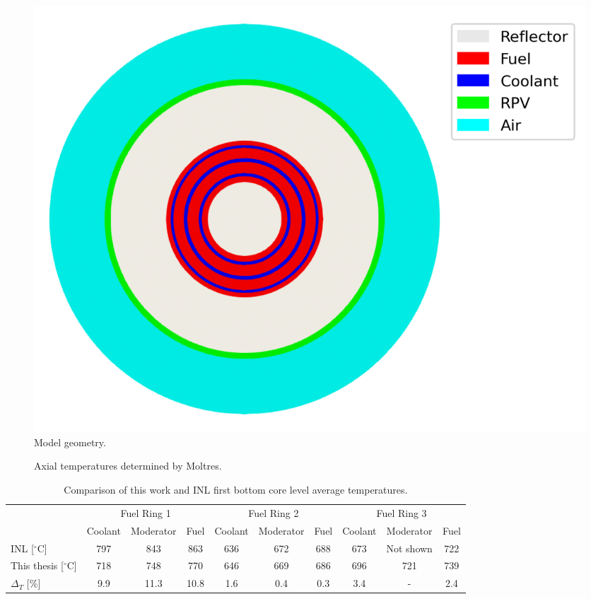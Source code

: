 \begin{figure}[htbp!]
  \centering
  \includegraphics[width=0.4\linewidth]{figures-thermal/ex2a-meshC2}
  \hfill
  \caption{Model geometry.}
  \label{fig:ex2a-2nd-model}
\end{figure}

\begin{figure}[htbp!]
  \centering
  \hfill
  \caption{Axial temperatures determined by Moltres.}
  \label{fig:ex2a-temps}
\end{figure}

\begin{table}[htbp!]
\centering
      \caption{Comparison of this work and INL \cite{strydom_inl_2013} first bottom core level average temperatures.}
      \label{tab:th-ex2a-results}
  \begin{tabular}{l|ccc|ccc|ccc}
    \toprule
          & \multicolumn{3}{c|}{Fuel Ring 1} & \multicolumn{3}{c|}{Fuel Ring 2} & \multicolumn{3}{c}{Fuel Ring 3} \\ \cline{2-10} 
          & Coolant & Moderator & Fuel & Coolant & Moderator & Fuel & Coolant & Moderator & Fuel \\
    \midrule
INL [$^{\circ}$C]         & 797  & 843  & 863  & 636  & 672  & 688  & 673  & Not shown  & 722  \\
This thesis [$^{\circ}$C] & 718  & 748  & 770  & 646  & 669  & 686  & 696  & 721        & 739  \\
$\Delta_T$ [\%]           & 9.9  & 11.3 & 10.8 & 1.6  & 0.4  & 0.3  & 3.4  & -          & 2.4  \\
    \bottomrule
  \end{tabular}
\end{table}

